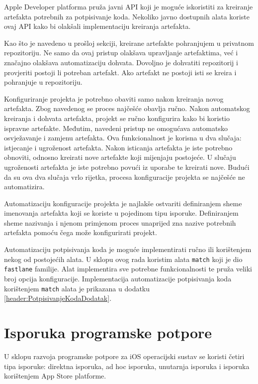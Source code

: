 \documentclass[times, utf8, diplomski, numeric]{fer}
\begin{document}
Apple Developer platforma pruža javni API koji je moguće iskoristiti za kreiranje artefakta potrebnih za potpisivanje koda. Nekoliko javno dostupnih alata koriste ovaj API kako bi olakšali implementaciju kreiranja artefakta.

Kao što je navedeno u prošloj sekciji, kreirane artefakte pohranjujem u privatnom repozitoriju. Ne samo da ovaj pristup olakšava upravljanje artefaktima, već i značajno olakšava automatizaciju dohvata. Dovoljno je dohvatiti repozitorij i provjeriti postoji li potreban artefakt. Ako artefakt ne postoji isti se kreira i pohranjuje u repozitoriju.

Konfiguriranje projekta je potrebno obaviti samo nakon kreiranja novog artefakta. Zbog navedenog se proces najčešće obavlja ručno. Nakon automatskog kreiranja i dohvata artefakta, projekt se ručno konfigurira kako bi koristio ispravne artefakte. Međutim, navedeni pristup ne omogućava automatsko osvježavanje i zamjenu artefakta. Ova funkcionalnost je korisna u dva slučaja: istjecanje i ugroženost artefakta. Nakon isticanja artefakta je iste potrebno obnoviti, odnosno kreirati nove artefakte koji mijenjaju postojeće. U slučaju ugroženosti artefakta je iste potrebno povući iz uporabe te kreirati nove. Budući da su ova dva slučaja vrlo rijetka, procesa konfiguracije projekta se najčešće ne automatizira.

Automatizaciju konfiguracije projekta je najlakše ostvariti definiranjem sheme imenovanja artefakta koji se koriste u pojedinom tipu isporuke. Definiranjem sheme nazivanja i njenom primjenom proces unaprijed zna nazive potrebnih artefakta pomoću čega može konfigurirati projekt.

Automatizaciju potpisivanja koda je moguće implementirati ručno ili korištenjem nekog od postojećih alata. U sklopu ovog rada koristim alata \verb|match| koji je dio \verb|fastlane| familije. Alat implementira sve potrebne funkcionalnosti te pruža veliki broj opcija konfiguracije. Implementacija automatizacije potpisivanja koda korištenjem \verb|match| alata je prikazana u dodatku \ref{header:PotpisivanjeKodaDodatak}.

\section{Isporuka programske potpore} \label{header:RucnaIsporuka}

U sklopu razvoja programske potpore za iOS operacijski sustav se koristi četiri tipa isporuke: direktna isporuka, ad hoc isporuka, unutarnja isporuka i isporuka korištenjem App Store platforme.
\end{document}
